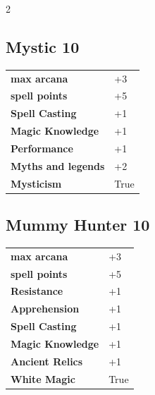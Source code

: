 \begin{multicols}{2}
\begin{tcolorbox}

\end{tcolorbox}

\begin{tcolorbox}
    \subsection*{Mystic \hfill \small{10 }}
    \tcblower




\begin{tabular}{@{}ll@{}}
    \textbf{max arcana} & +3\\
    \textbf{spell points} & +5\\
    \textbf{Spell Casting} & +1\\
    \textbf{Magic Knowledge} & +1\\
    \textbf{Performance} & +1\\
    \textbf{Myths and legends} & +2\\
    \textbf{Mysticism} & True\\
\end{tabular}


\end{tcolorbox}

\begin{tcolorbox}
    \subsection*{Mummy Hunter \hfill \small{10 }}
    \tcblower




\begin{tabular}{@{}ll@{}}
    \textbf{max arcana} & +3\\
    \textbf{spell points} & +5\\
    \textbf{Resistance} & +1\\
    \textbf{Apprehension} & +1\\
    \textbf{Spell Casting} & +1\\
    \textbf{Magic Knowledge} & +1\\
    \textbf{Ancient Relics} & +1\\
    \textbf{White Magic} & True\\
\end{tabular}


\end{tcolorbox}
\end{multicols}
